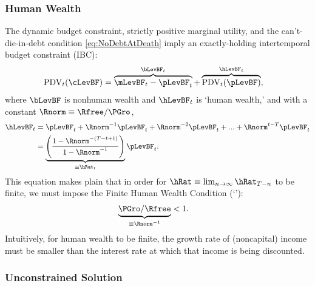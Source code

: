 \documentclass[BufferStockTheory]{subfiles}
\begin{document}
\subsubsection{Human Wealth}
The dynamic budget constraint, strictly positive marginal utility, and the can't-die-in-debt condition \eqref{eq:NoDebtAtDeath} imply an exactly-holding intertemporal budget constraint (IBC):
\begin{equation}\begin{gathered}\begin{aligned}
  \text{PDV}_{t}(\cLevBF)  & = \overbrace{\mLevBF_{t}-\pLevBF_{t}}^{\bLevBF_{t}}+\overbrace{\text{PDV}_{t}(\pLevBF)}^{\hLevBF_{t}}, \label{eq:IBCFinite}
\end{aligned}\end{gathered}\end{equation}
where $\bLevBF$ is nonhuman wealth and $\hLevBF_{t}$ is `human wealth,' and with a constant $\Rnorm \equiv \Rfree/\PGro$,
\begin{equation}\begin{gathered}\begin{aligned}
  \hLevBF_{t}  & = \pLevBF_{t}+\Rnorm^{-1} \pLevBF_{t} + \Rnorm^{-2} \pLevBF_{t} + ... + \Rnorm^{t-T} \pLevBF_{t} \label{eq:HDef}
  \\  & = \underbrace{\left(\frac{1-\Rnorm^{-(T-t+1)}}{1-\Rnorm^{-1}}\right)}_{\equiv \hRat_{t}}\pLevBF_{t} .
\end{aligned}\end{gathered}\end{equation}
This equation makes plain that in order for $\hRat \equiv \lim_{n \rightarrow
  \infty} \hRat_{T-n}$ to be finite, we must
impose the Finite Human Wealth Condition (`\FHWC'): \hypertarget{FHWC}{}
\begin{equation}\begin{gathered}\begin{aligned}
  \underbrace{\PGro/\Rfree}_{\equiv \Rnorm^{-1}}  & < 1 \label{eq:FHWC}.
\end{aligned}\end{gathered}\end{equation}
Intuitively, for human wealth to be finite, the growth rate of (noncapital) income must be smaller than
the interest rate at which that income is being discounted.

\hypertarget{Unconstrained-Solution}{}
\subsubsection{Unconstrained Solution} \label{subsec:PFUncon}
\end{document}
